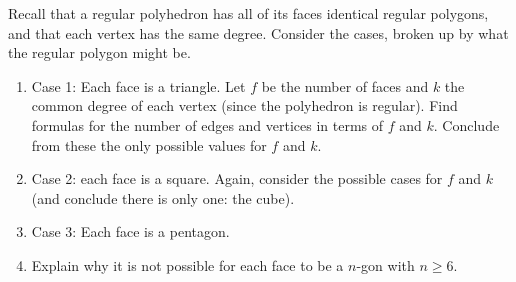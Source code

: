 \documentclass{book}
\begin{document}
\setcounter{project}{35}
\addtocounter{project}{-1}
\begin{activity}[]\label{activity-30}
\hypertarget{p-338}{}%
Recall that a regular polyhedron has all of its faces identical regular polygons, and that each vertex has the same degree. Consider the cases, broken up by what the regular polygon might be.%
\begin{enumerate}[font=\bfseries,label=(\alph*),ref=\alph*]
\item\label{task-47} \hypertarget{p-339}{}%
Case 1: Each face is a triangle.  Let \(f\) be the number of faces and \(k\) the common degree of each vertex (since the polyhedron is regular).  Find formulas for the number of edges and vertices in terms of \(f\) and \(k\).  Conclude from these the only possible values for \(f\) and \(k\).%
\item\label{task-48} \hypertarget{p-342}{}%
Case 2: each face is a square.  Again, consider the possible cases for \(f\) and \(k\) (and conclude there is only one: the cube).%
\item\label{task-49} \hypertarget{p-346}{}%
Case 3: Each face is a pentagon.%
\item\label{task-50} \hypertarget{p-349}{}%
Explain why it is not possible for each face to be a \(n\)-gon with \(n \ge 6\).%
\end{enumerate}
\end{activity}
\end{document}
